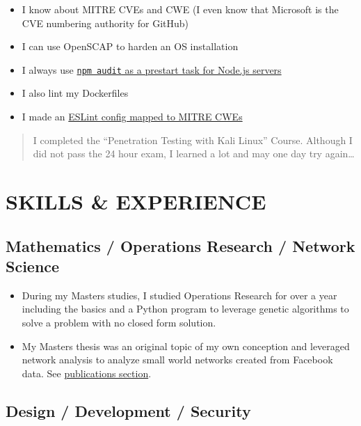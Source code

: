 \documentclass[10pt]{article}
\def\tightlist{}
\begin{document}
\begin{itemize}
\tightlist
\item
  I know about MITRE CVEs and CWE (I even know that Microsoft is the CVE
  numbering authority for GitHub)
\item
  I can use OpenSCAP to harden an OS installation
\item
  I always use
  \href{https://github.com/jhwohlgemuth/tomo-cli/blob/master/src/commands/create-server/index.js\#L82}{\texttt{npm\ audit}
  as a prestart task for Node.js servers}
\item
  I also lint my Dockerfiles
\item
  I made an
  \href{https://github.com/omahajs/eslint-config-omaha-prime-grade/blob/master/RULES_FOR_SECURITY.md}{ESLint
  config mapped to MITRE CWEs}
\end{itemize}

\begin{quote}
I completed the ``Penetration Testing with Kali Linux'' Course. Although
I did not pass the 24 hour exam, I learned a lot and may one day try
again\ldots{}
\end{quote}

\hypertarget{skills-experience}{%
\section{SKILLS \& EXPERIENCE}\label{skills-experience}}

\hypertarget{mathematics-operations-research-network-science}{%
\subsection{Mathematics / Operations Research / Network
Science}\label{mathematics-operations-research-network-science}}

\begin{itemize}
\tightlist
\item
  During my Masters studies, I studied Operations Research for over a
  year including the basics and a Python program to leverage genetic
  algorithms to solve a problem with no closed form solution.
\item
  My Masters thesis was an original topic of my own conception and
  leveraged network analysis to analyze small world networks created
  from Facebook data. See
  \protect\hyperlink{publications-citations}{publications section}.
\end{itemize}

\hypertarget{design-development-security}{%
\subsection{Design / Development /
Security}\label{design-development-security}}
\end{document}
